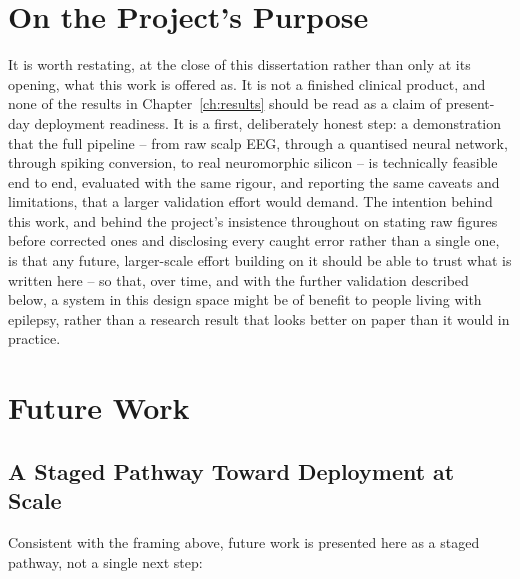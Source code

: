 \section{On the Project's Purpose}

It is worth restating, at the close of this dissertation rather than only at its opening, what this work is offered as. It is not a finished clinical product, and none of the results in Chapter~\ref{ch:results} should be read as a claim of present-day deployment readiness. It is a first, deliberately honest step: a demonstration that the full pipeline -- from raw scalp EEG, through a quantised neural network, through spiking conversion, to real neuromorphic silicon -- is technically feasible end to end, evaluated with the same rigour, and reporting the same caveats and limitations, that a larger validation effort would demand. The intention behind this work, and behind the project's insistence throughout on stating raw figures before corrected ones and disclosing every caught error rather than a single one, is that any future, larger-scale effort building on it should be able to trust what is written here -- so that, over time, and with the further validation described below, a system in this design space might be of benefit to people living with epilepsy, rather than a research result that looks better on paper than it would in practice.

\section{Future Work}

\subsection{A Staged Pathway Toward Deployment at Scale}

Consistent with the framing above, future work is presented here as a staged pathway, not a single next step:

